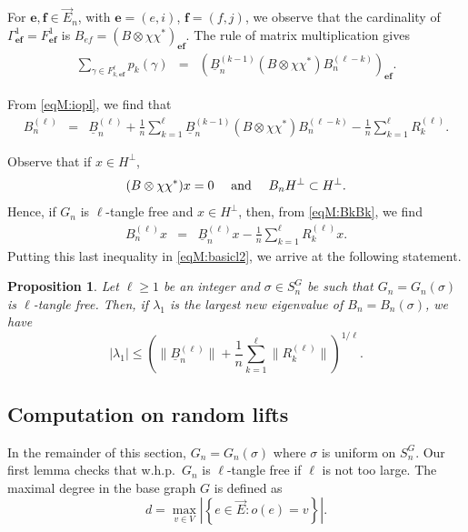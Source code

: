 \documentclass[11pt]{article}
\newtheorem{proposition}[lemma]{Proposition}
\newcommand{\ABS}[1]{{{\left| #1 \right|}}} %
\newcommand{\BRA}[1]{{{\left\{#1\right\}}}}
\newcommand{\PAR}[1]{{{\left(#1\right)}}} %
\newcommand{\uB}{{\underline B}}
\newcommand{\1}{1\!\!{\sf I}}\newcommand{\IND}{\1}
\newcommand{\Be}{\bm{e}}
\newcommand{\Bf}{\bm{f}}
\newcommand{\whp}{{w.h.p.~}}
\begin{document}
For $\Be,\Bf \in \vec E_n$, with $\Be = (e,i)$, $\Bf = (f,j)$, we observe that  the cardinality of $\Gamma^1_{\Be \Bf} = F^1_{\Be \Bf}$ is $B_{e f} = (B \otimes \chi \chi^*)_{\Be \Bf}$. The rule of matrix multiplication gives 
\begin{eqnarray*}
 \sum_{\gamma \in F^{\ell} _{k,\Be \Bf}}  p_k(\gamma)  & = &( \uB_n^{(k-1)} ( B \otimes \chi \chi^* )  B_n^{(\ell - k)})_{\Be \Bf}. 
\end{eqnarray*}


From \eqref{eqM:iopl}, we find that  
\begin{eqnarray*}
B^{(\ell)}_n   &= &\uB^{(\ell)}_n    +    \frac 1 {n}  \sum_{k = 1} ^{\ell} \uB^{(k-1)}_n  ( B \otimes \chi \chi^* )   B^{(\ell-k)}_n   -   \frac 1 {n}     \sum_{k = 1}^{\ell} R^{(\ell)}_k .
\end{eqnarray*}

Observe that if $x \in H^\perp$, 
$$
(B \otimes \chi \chi^* ) x = 0 \quad \hbox{ and } \quad B_n H^{\perp} \subset H^{\perp}. 
$$
Hence, if $G_n$ is $\ell$-tangle free and $ x  \in H^\perp$,  then, from \eqref{eqM:BkBk},  we find
\begin{eqnarray*}
  B^{(\ell)}_n  x  &   = &  \uB^{(\ell)}_n   x   -    \frac 1 {n}     \sum_{k = 1}^{\ell} R^{(\ell)}_k x.
\end{eqnarray*}
Putting this last inequality in \eqref{eqM:basicl2}, we arrive at the following statement. 

\begin{proposition}\label{leM:decompBl}
Let $\ell \geq 1$ be an integer and $\sigma \in S_n^G$ be such that $G_n = G_n(\sigma)$ is $\ell$-tangle free. Then, if $\lambda_1$ is the largest new eigenvalue of $B_n = B_n (\sigma)$, we have
$$
|\lambda_1 | \leq  \PAR{ \| \uB^{(\ell)}_n   \|   +    \frac 1 {n}     \sum_{k = 1}^{\ell} \| R^{(\ell)}_k \|}^{1/\ell}.$$
\end{proposition}



\subsection{Computation on random lifts}

\label{subsecM:CM}

In the remainder of this section, $G_n= G_n(\sigma)$ where $\sigma$ is uniform on $S_n^G$.  Our first lemma checks that \whp$G_n$ is $\ell$-tangle free if $\ell$ is not too large. 
The maximal degree in the base graph $G$ is defined as  
\begin{equation}\label{eq:deftheta}
d  = \max_{ v \in V} \ABS{\BRA{ e \in \vec E : o(e) = v }}.
\end{equation}
\end{document}
